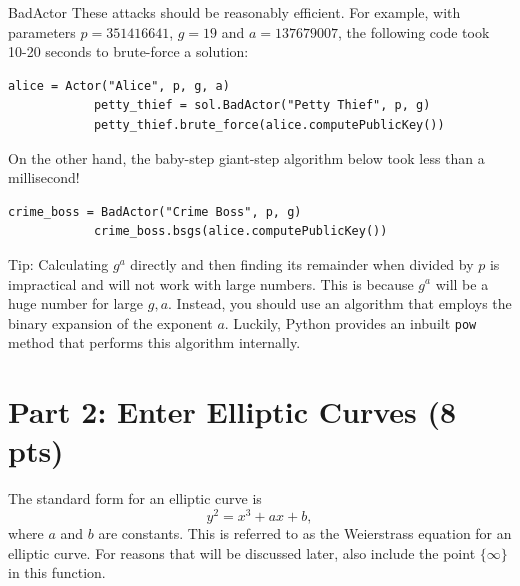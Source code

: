 \documentclass{article}
\begin{document}
\begin{tcolorbox}[enhanced,interior style={top color=Plum!20,bottom color=Plum!30}]
\begin{mybox}[
            colframe=purple!50!black,
            colback=purple!30,
            colbacktitle=purple!50!white,
            coltitle=purple!30!black,
            ]{BadActor}
        These attacks should be reasonably efficient. For example, with parameters $p = 351416641$, $g = 19$ and $a = 137679007$, the following code took 10-20 seconds to brute-force a solution:
        \begin{lstlisting}[belowskip=-10pt]
            alice = Actor("Alice", p, g, a)
            petty_thief = sol.BadActor("Petty Thief", p, g)
            petty_thief.brute_force(alice.computePublicKey())
        \end{lstlisting}
        On the other hand, the baby-step giant-step algorithm below took less than a millisecond!
        \begin{lstlisting}[belowskip=-10pt]
            crime_boss = BadActor("Crime Boss", p, g)
            crime_boss.bsgs(alice.computePublicKey())
        \end{lstlisting}
        
        \end{mybox}
    
        \vspace{2mm}
        Tip: Calculating $g^{a}$ directly and then finding its remainder when divided by $p$ is impractical and will not work with large numbers. This is because $g^{a}$ will be a huge number for large $g, a$. Instead, you should use an algorithm that employs the binary expansion of the exponent $a$\footnotemark. Luckily, Python provides an inbuilt \lstinline{pow} method that performs this algorithm internally.
    \end{tcolorbox}



\section*{Part 2: Enter Elliptic Curves (8 pts)}

The standard form for an elliptic curve is $$y^{2} = x^{3} + ax + b,$$ where $a$ and $b$ are constants. This is referred to as the Weierstrass equation for an elliptic curve. For reasons that will be discussed later, also include the point $\{\infty\}$ in this function.
\end{document}
